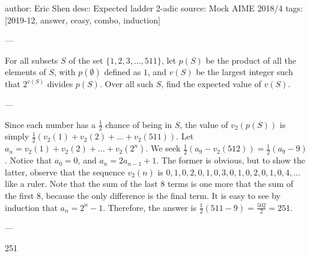 author: Eric Shen
desc: Expected ladder 2-adic
source: Mock AIME 2018/4
tags: [2019-12, answer, ceasy, combo, induction]

---

For all subsets $S$ of the set $\{1, 2, 3, \ldots, 511\}$, let $p(S)$ be the product of all the elements of $S$, with $p\left(\emptyset\right)$ defined as $1$, and $v(S)$ be the largest integer such that $2^{v(S)}$ divides $p(S)$. Over all such $S$, find the expected value of $v(S)$.

---

Since each number has a $\frac{1}{2}$ chance of being in $S$, the value of $v_2(p(S))$ is simply $\frac{1}{2}\left(v_2(1)+v_2(2)+\ldots+v_2(511)\right)$. Let $a_n=v_2(1)+v_2(2)+\ldots+v_2\left(2^n\right)$. We seek $\frac{1}{2}(a_9-v_2(512))=\frac{1}{2}(a_9-9)$. Notice that $a_0=0$, and $a_n=2a_{n-1}+1$. The former is obvious, but to show the latter, observe that the sequence $v_2(n)$ is $0,1,0,2,0,1,0,3,0,1,0,2,0,1,0,4,\ldots$ like a ruler. Note that the sum of the last $8$ terms is one more that the sum of the first $8$, because the only difference is the final term. It is easy to see by induction that $a_n=2^n-1$. Therefore, the answer is $\frac{1}{2}(511-9)=\frac{502}{2}=251$.

---

251
